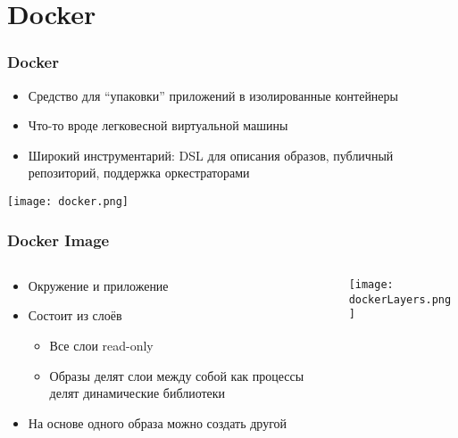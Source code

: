 \documentclass{../../slides-style}
\begin{document}
    \begin{frame}[plain]
        \titlepage
    \end{frame}

    \section{Docker}

    \begin{frame}
        \frametitle{Docker}
        \begin{itemize}
            \item Средство для ``упаковки'' приложений в изолированные контейнеры
            \item Что-то вроде легковесной виртуальной машины
            \item Широкий инструментарий: DSL для описания образов, публичный репозиторий, поддержка оркестраторами
        \end{itemize}
        \begin{center}
            \texttt{[image: docker.png]}
        \end{center}
    \end{frame}

    \begin{frame}
        \frametitle{Docker Image}
        \begin{columns}
            \begin{column}{0.6\textwidth}
                \begin{itemize}
                    \item Окружение и приложение
                    \item Состоит из слоёв
                    \begin{itemize}
                        \item Все слои read-only
                        \item Образы делят слои между собой как процессы делят динамические библиотеки
                    \end{itemize}
                    \item На основе одного образа можно создать другой
                \end{itemize}
            \end{column}
            \begin{column}{0.4\textwidth}
                \texttt{[image: dockerLayers.png]}
            \end{column}
        \end{columns}
    \end{frame}
\end{document}
